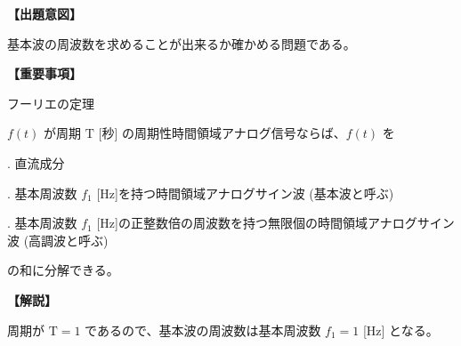 \noindent \textbf{【出題意図】}

\noindent 基本波の周波数を求めることが出来るか確かめる問題である。

\vspace{1em}
\noindent \textbf{【重要事項】}

\noindent フーリエの定理

\smallskip
$f(t)$ が周期 $\textrm{T}$ [秒] の周期性時間領域アナログ信号ならば、$f(t)$ を

. 直流成分

. 基本周波数 $f_1$ [Hz]を持つ時間領域アナログサイン波 (基本波と呼ぶ)

. 基本周波数 $f_1$ [Hz]の正整数倍の周波数を持つ無限個の時間領域アナログサイン波 (高調波と呼ぶ)

\smallskip
の和に分解できる。


\vspace{1em}
\noindent \textbf{【解説】}

\noindent 周期が $\textrm{T}=1$ であるので、基本波の周波数は基本周波数 $f_1 = 1$ [Hz] となる。
